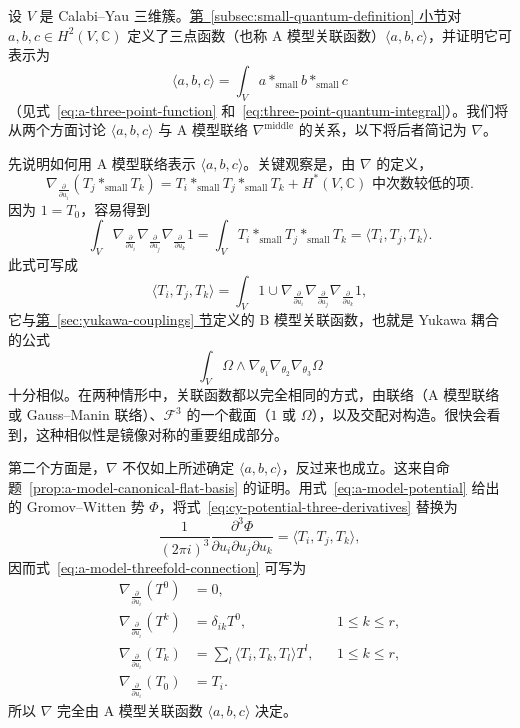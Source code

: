 \begin{example}\label{ex:a-model-yukawa-connection}
设 $V$ 是 Calabi--Yau 三维簇。\hyperref[subsec:small-quantum-definition]{第~\ref*{subsec:small-quantum-definition} 小节}对 $a,b,c\in H^2(V,\mathbb C)$ 定义了三点函数（也称 A 模型关联函数）$\langle a,b,c\rangle$，并证明它可表示为
\[
\langle a,b,c\rangle=\int_Va*_{\mathrm{small}}b*_{\mathrm{small}}c
\]
（见式~\eqref{eq:a-three-point-function} 和~\eqref{eq:three-point-quantum-integral}）。我们将从两个方面讨论 $\langle a,b,c\rangle$ 与 A 模型联络 $\nabla^{\mathrm{middle}}$ 的关系，以下将后者简记为 $\nabla$。

先说明如何用 A 模型联络表示 $\langle a,b,c\rangle$。关键观察是，由 $\nabla$ 的定义，
\[
\nabla_{\frac{\partial}{\partial u_i}}(T_j*_{\mathrm{small}}T_k)
=T_i*_{\mathrm{small}}T_j*_{\mathrm{small}}T_k
+H^*(V,\mathbb C)\text{ 中次数较低的项}.
\]
因为 $1=T_0$，容易得到
\[
\int_V\nabla_{\frac{\partial}{\partial u_i}}\nabla_{\frac{\partial}{\partial u_j}}\nabla_{\frac{\partial}{\partial u_k}}1
=\int_VT_i*_{\mathrm{small}}T_j*_{\mathrm{small}}T_k=\langle T_i,T_j,T_k\rangle.
\]
此式可写成
\begin{equation}\label{eq:a-model-yukawa-derivatives}
\langle T_i,T_j,T_k\rangle
=\int_V1\cup\nabla_{\frac{\partial}{\partial u_i}}\nabla_{\frac{\partial}{\partial u_j}}\nabla_{\frac{\partial}{\partial u_k}}1,
\end{equation}
它与\hyperref[sec:yukawa-couplings]{第~\ref*{sec:yukawa-couplings} 节}定义的 B 模型关联函数，也就是 Yukawa 耦合的公式
\[
\int_V\Omega\wedge\nabla_{\theta_1}\nabla_{\theta_2}\nabla_{\theta_3}\Omega
\]
十分相似。在两种情形中，关联函数都以完全相同的方式，由联络（A 模型联络或 Gauss--Manin 联络）、$\mathcal F^3$ 的一个截面（$1$ 或 $\Omega$），以及交配对构造。很快会看到，这种相似性是镜像对称的重要组成部分。

第二个方面是，$\nabla$ 不仅如上所述确定 $\langle a,b,c\rangle$，反过来也成立。这来自命题~\ref{prop:a-model-canonical-flat-basis} 的证明。用式~\eqref{eq:a-model-potential} 给出的 Gromov--Witten 势 $\Phi$，将式~\eqref{eq:cy-potential-three-derivatives} 替换为
\begin{equation}\label{eq:a-model-yukawa-potential}
\frac1{(2\pi i)^3}\frac{\partial^3\Phi}{\partial u_i\partial u_j\partial u_k}=\langle T_i,T_j,T_k\rangle,
\end{equation}
因而式~\eqref{eq:a-model-threefold-connection} 可写为
\begin{equation}\label{eq:a-model-yukawa-full-connection}
\begin{aligned}
\nabla_{\frac{\partial}{\partial u_i}}(T^0)&=0,\\
\nabla_{\frac{\partial}{\partial u_i}}(T^k)&=\delta_{ik}T^0,&&1\le k\le r,\\
\nabla_{\frac{\partial}{\partial u_i}}(T_k)&=\sum_l\langle T_i,T_k,T_l\rangle T^l,&&1\le k\le r,\\
\nabla_{\frac{\partial}{\partial u_i}}(T_0)&=T_i.
\end{aligned}
\end{equation}
所以 $\nabla$ 完全由 A 模型关联函数 $\langle a,b,c\rangle$ 决定。


\end{example}
